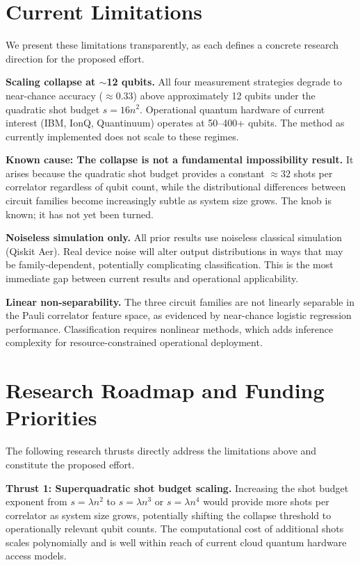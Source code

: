 \documentclass[11pt,twocolumn]{article}
\begin{document}
\section{Current Limitations}
\label{sec:limitations}

We present these limitations transparently, as each
defines a concrete research direction for the proposed
effort.

\textbf{Scaling collapse at $\sim$12 qubits.} All four
measurement strategies degrade to near-chance accuracy
($\approx 0.33$) above approximately 12 qubits under the
quadratic shot budget $s = 16n^2$. Operational quantum
hardware of current interest (IBM, IonQ, Quantinuum)
operates at 50--400+ qubits. The method as currently
implemented does not scale to these regimes.

\textbf{Known cause: The collapse is not a fundamental
impossibility result.} It arises because the quadratic
shot budget provides a constant $\approx 32$ shots per
correlator regardless of qubit count, while the
distributional differences between circuit families
become increasingly subtle as system size grows. The
knob is known; it has not yet been turned.

\textbf{Noiseless simulation only.} All prior results
use noiseless classical simulation (Qiskit Aer). Real
device noise will alter output distributions in ways
that may be family-dependent, potentially complicating
classification. This is the most immediate gap between
current results and operational applicability.

\textbf{Linear non-separability.} The three circuit
families are not linearly separable in the Pauli
correlator feature space, as evidenced by near-chance
logistic regression performance. Classification requires
nonlinear methods, which adds inference complexity for
resource-constrained operational deployment.

\section{Research Roadmap and Funding Priorities}

The following research thrusts directly address the
limitations above and constitute the proposed effort.

\textbf{Thrust 1: Superquadratic shot budget scaling.}
Increasing the shot budget exponent from $s = \lambda n^2$
to $s = \lambda n^3$ or $s = \lambda n^4$ would provide
more shots per correlator as system size grows,
potentially shifting the collapse threshold to
operationally relevant qubit counts. The computational
cost of additional shots scales polynomially and is
well within reach of current cloud quantum hardware
access models.
\end{document}
